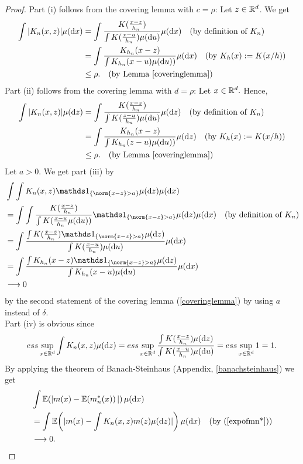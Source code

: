 \begin{proof}
    Part (i) follows from the covering lemma with $c = \rho$: Let $z \in \mathbb{R}^d$. We get
    \begin{align*}
        \int |K_n(x,z)| \mu(\diff{x}) 
        &= \int \frac{K(\frac{x-z}{h_n})}{\int K(\frac{x-u}{h_n}) \mu(\diff{u})} \mu(\diff{x}) \quad\text{(by definition of $K_n$)} \\
        &= \int \frac{K_{h_n}(x-z)}{\int K_{h_n}(x-u) \mu(\diff{u}))} \mu(\diff{x}) \quad\text{(by $K_h(x):=K(x/h)$)} \\
        &\leq \rho. \quad \text{(by Lemma \ref{coveringlemma})}
    \end{align*}
    Part (ii) follows from the covering lemma with $d = \rho$: Let $x \in \mathbb{R}^d.$ Hence,
    \begin{align*}
        \int |K_n(x,z)| \mu(\diff{z}) 
        &= \int \frac{K(\frac{x-z}{h_n})}{\int K(\frac{z-u}{h_n}) \mu(\diff{u})} \mu(\diff{z}) \quad\text{(by definition of $K_n$)} \\
        &= \int \frac{K_{h_n}(x-z)}{\int K_{h_n}(z-u) \mu(\diff{u}))} \mu(\diff{z}) \quad\text{(by $K_h(x):=K(x/h)$)} \\
        &\leq \rho. \quad \text{(by Lemma \ref{coveringlemma})}
    \end{align*}
    Let $a>0$. We get part (iii) by
    \begin{align*}
        & \int \int K_n(x,z) \ind{\{\norm{x-z}>a\}} \mu(\diff{z}) \mu(\diff{x}) \\
        &= \int \int \frac{K(\frac{x-z}{h_n})}{\int K(\frac{x-u}{h_n} \mu(\diff{u}))} \ind{\{\norm{x-z}>a\}} \mu(\diff{z}) \mu(\diff{x}) \quad\text{(by definition of $K_n$)} \\
        &= \int \frac{\int K(\frac{x-z}{h_n}) \ind{\{\norm{x-z}>a\}} \mu(\diff{z})}{\int K(\frac{x-u}{h_n}) \mu(\diff{u})} \mu(\diff{x}) \\
        &= \int \frac{\int K_{h_n}(x-z) \ind{\{\norm{x-z}>a\}} \mu(\diff{z})}{\int K_{h_n}(x-u) \mu(\diff{u})} \mu(\diff{x})\\
        &\longrightarrow 0 
    \end{align*}
    by the second statement of the covering lemma (\ref{coveringlemma}) by using $a$ instead of $\delta$.\\
    Part (iv) is obvious since
    \begin{align*}
        ess\sup\limits_{x \in \mathbb{R}^d} \int K_n(x,z) \mu(\mathop{}\!\mathrm{d}{z})
        = ess\sup\limits_{x \in \mathbb{R}^d} \frac{\int K(\frac{x-z}{h_n}) \mu(\mathop{}\!\mathrm{d}{z})}{\int K(\frac{x-u}{h_n}) \mu(\mathop{}\!\mathrm{d}{u})}
        = ess\sup\limits_{x \in \mathbb{R}^d} 1
        = 1.
    \end{align*}
    By applying the theorem of Banach-Steinhaus (Appendix, \ref{banachsteinhaus}) we get
    \begin{align*}
        &\int \mathbb{E}\!\left(|m(x)-\mathbb{E}\!\left(m_n^*(x)\right)|\right)\mu(\mathop{}\!\mathrm{d}{x}) \\
        &= \int \mathbb{E}\!\left(|m(x)-\int K_n(x,z)m(z)\mu(\mathop{}\!\mathrm{d}{z})|\right)\mu(\mathop{}\!\mathrm{d}{x}) \quad\text{(by (\ref{expofmn*}))} \\
        & \longrightarrow 0.
    \end{align*}


\end{proof}
